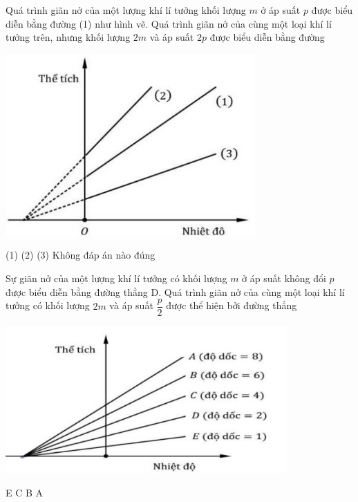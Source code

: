 \begin{ex}
Quá trình giãn nở của một lượng khí lí tưởng khối lượng $m$ ở áp suất $p$ được biểu diễn bằng đường (1) như hình vẽ. Quá trình giãn nở của cùng một loại khí lí tưởng trên, nhưng khối lượng $2m$ và áp suất $2p$ được biểu diễn bằng đường
\begin{center}
	\includegraphics[width=0.35\linewidth]{figs/VN12-Y24-PH-SYL-014P-5}
\end{center}
	
	\choice
	{\True (1)}
	{(2)}
	{(3)}
	{Không đáp án nào đúng}
\end{ex}
\begin{ex}
	Sự giãn nở của một lượng khí lí tưởng có khối lượng $m$ ở áp suất không đổi $p$ được biểu diễn bằng đường thẳng D. Quá trình giãn nở của cùng một loại khí lí tưởng có khối lượng $2m$ và áp suất $\dfrac{p}{2}$ được thể hiện bởi đường thẳng
	\begin{center}
		\includegraphics[width=0.45\linewidth]{figs/VN12-Y24-PH-SYL-014P-6}
	\end{center} 
	
	\choice
	{E}
	{C}
	{B}
	{\True A}
\end{ex}
